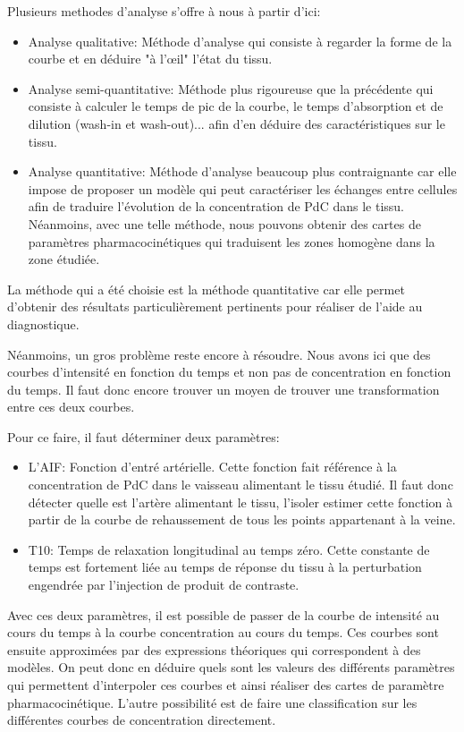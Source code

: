 Plusieurs methodes d'analyse s'offre à nous à partir d'ici:

\begin{itemize}
\item Analyse qualitative: Méthode d'analyse qui consiste à regarder la forme de la courbe et en déduire "à l'œil" l'état du tissu.
\item Analyse semi-quantitative: Méthode plus rigoureuse que la précédente qui consiste à calculer le temps de pic de la courbe, le temps d'absorption et de dilution (wash-in et wash-out)... afin d'en déduire des caractéristiques sur le tissu.
\item Analyse quantitative: Méthode d'analyse beaucoup plus contraignante car elle impose de proposer un modèle qui peut caractériser les échanges entre cellules afin de traduire l'évolution de la concentration de PdC dans le tissu. Néanmoins, avec une telle méthode, nous pouvons obtenir des cartes de paramètres pharmacocinétiques qui traduisent les zones homogène dans la zone étudiée.
\end{itemize}

La méthode qui a été choisie est la méthode quantitative car elle permet d'obtenir des résultats particulièrement pertinents pour réaliser de l'aide au diagnostique.

\medskip 

Néanmoins, un gros problème reste encore à résoudre. Nous avons ici que des courbes d'intensité en fonction du temps et non pas de concentration en fonction du temps. Il faut donc encore trouver un moyen de trouver une transformation entre ces deux courbes.

Pour ce faire, il faut déterminer deux paramètres:

\begin{itemize}
\item L'AIF: Fonction d'entré artérielle. Cette fonction fait référence à la concentration de PdC dans le vaisseau alimentant le tissu étudié. Il faut donc détecter quelle est l'artère alimentant le tissu, l'isoler estimer cette fonction à partir de la courbe de rehaussement de tous les points appartenant à la veine.
\item T10: Temps de relaxation longitudinal au temps zéro. Cette constante de temps est fortement liée au temps de réponse du tissu à la perturbation engendrée par l'injection de produit de contraste.
\end{itemize}

Avec ces deux paramètres, il est possible de passer de la courbe de intensité au cours du temps à la courbe concentration au cours du temps. Ces courbes sont ensuite approximées par des expressions théoriques qui correspondent à des modèles. On peut donc en déduire quels sont les valeurs des différents paramètres qui permettent d'interpoler ces courbes et ainsi réaliser des cartes de paramètre pharmacocinétique. L'autre possibilité est de faire une classification sur les différentes courbes de concentration directement.


